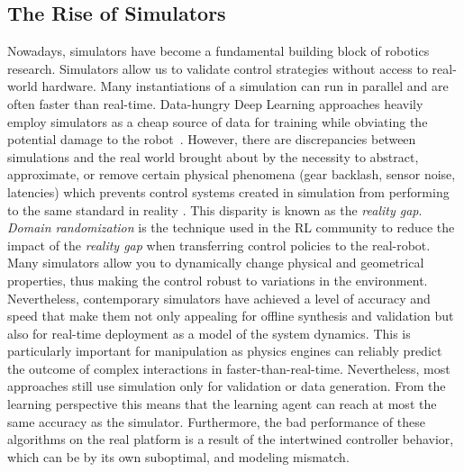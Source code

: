 \subsection{The Rise of Simulators}
Nowadays, simulators have become a fundamental building block of robotics research. Simulators allow us to validate control strategies without access to real-world hardware. Many instantiations of a simulation can run in parallel and are often faster than real-time. Data-hungry Deep Learning approaches heavily employ simulators as a cheap source of data for training while obviating the potential damage to the robot~\cite{liang_gpu-accelerated_2018}. However, there are discrepancies between simulations and the real world brought about by the necessity to abstract, approximate, or remove certain physical phenomena (gear backlash, sensor noise, latencies) which prevents control systems created in simulation from performing to the same standard in reality \cite{collins_benchmarking_2020}. This disparity is known as the \emph{reality gap}. \emph{Domain randomization} is the technique used in the RL community to reduce the impact of the \emph{reality gap} when transferring control policies to the real-robot. Many simulators allow you to dynamically change physical and geometrical properties, thus making the control robust to variations in the environment. Nevertheless, contemporary simulators have achieved a level of accuracy and speed that make them not only appealing for offline synthesis and validation but also for real-time deployment as a model of the system dynamics. This is particularly important for manipulation as physics engines can reliably predict the outcome of complex interactions in faster-than-real-time. Nevertheless, most approaches still use simulation only for validation or data generation. From the learning perspective this means that the learning agent can reach at most the same accuracy as the simulator. Furthermore, the bad performance of these algorithms on the real platform is a result of the intertwined controller behavior, which can be by its own suboptimal, and modeling mismatch.   

